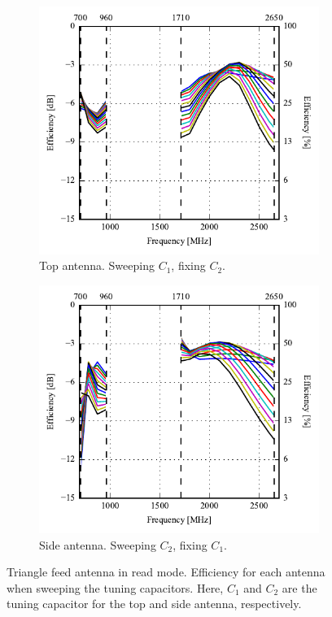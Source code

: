 \begin{figure}[htbp]
    \centering
    \begin{subfigure}{0.49\linewidth}
        \centering
        \includegraphics{img/tech_sol/trianglefeed/read_mode/efficiency-ac1-Csh1.pdf}
        \caption{Top antenna. Sweeping $C_1$, fixing $C_2$.}
    \end{subfigure}
    \hfill
    \begin{subfigure}{0.49\linewidth}
        \centering
        \includegraphics{img/tech_sol/trianglefeed/read_mode/efficiency-ac2-Csh2.pdf}
        \caption{Side antenna. Sweeping $C_2$, fixing $C_1$.}
    \end{subfigure}
    \caption{Triangle feed antenna in read mode. Efficiency for each antenna when sweeping the tuning capacitors. Here, $C_1$ and $C_2$ are the tuning capacitor for the top and side antenna, respectively.}
    \label{fig:eff_sol2read}
\end{figure}


